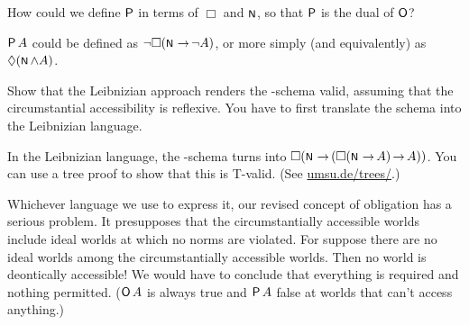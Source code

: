 
\begin{exercise}
  How could we define $\operatorname{\mathsf{P}}$ in terms of $\Box$ and $\OK$, so that $\operatorname{\mathsf{P}}$ is the
  dual of $\operatorname{\mathsf{O}}$? 
\end{exercise}
\begin{solution}
  $\operatorname{\mathsf{P}} A$ could be defined as $\neg\Box(\OK \to \neg A)$, or more simply (and
  equivalently) as $\Diamond (\OK \land A)$.
\end{solution}

\begin{exercise}
  Show that the Leibnizian approach renders the -schema valid, assuming
  that the circumstantial accessibility is reflexive. You have to first
  translate the schema into the Leibnizian language.
\end{exercise}
\begin{solution}
  In the Leibnizian language, the -schema turns into
  $\Box(\OK \to (\Box(\OK \to A) \to A))$. You can use a tree proof to show that
  this is T-valid. (See \href{https://www.umsu.de/trees/}{umsu.de/trees/}.)

\end{solution}


Whichever language we use to express it, our revised concept of obligation has a
serious problem. It presupposes that the circumstantially accessible worlds
include ideal worlds at which no norms are violated. For suppose there are no
ideal worlds among the circumstantially accessible worlds. Then no world is
deontically accessible! We would have to conclude that everything is required
and nothing permitted. ($\operatorname{\mathsf{O}} A$ is always true and $\operatorname{\mathsf{P}} A$ false at worlds that
can't access anything.)

